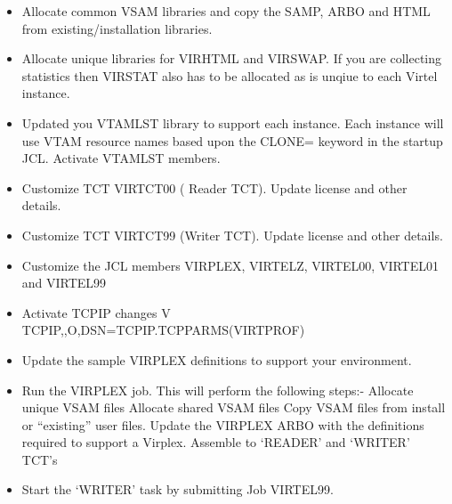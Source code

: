 \documentclass[letterpaper,10pt,english]{sphinxmanual}
\begin{document}
\begin{sphinxVerbatim}[commandchars=\\\{\}]
            
\end{sphinxVerbatim}
\begin{itemize}
\item {} 
Allocate common VSAM libraries and copy the SAMP, ARBO and HTML from existing/installation libraries.

\item {} 
Allocate unique libraries for VIRHTML and VIRSWAP. If you are collecting statistics then VIRSTAT also has to be allocated as is unqiue to each Virtel instance.

\item {} 
Updated you VTAMLST library to support each instance. Each instance will use VTAM resource names based upon the CLONE= keyword in the startup JCL. Activate VTAMLST members.

\item {} 
Customize TCT VIRTCT00 ( Reader TCT). Update license and other details.

\item {} 
Customize TCT VIRTCT99 (Writer TCT). Update license and other details.

\item {} 
Customize the JCL members VIRPLEX, VIRTELZ, VIRTEL00, VIRTEL01 and VIRTEL99

\item {} 
Activate TCPIP changes \textendash{} V TCPIP,,O,DSN=TCPIP.TCPPARMS(VIRTPROF)

\item {} 
Update the sample VIRPLEX definitions to support your environment.

\item {} 
Run the VIRPLEX job. This will perform the following steps:-
Allocate unique VSAM files
Allocate shared VSAM files
Copy VSAM files from install or “existing” user files.
Update the VIRPLEX ARBO with the definitions required to support a Virplex.
Assemble to ‘READER’ and ‘WRITER’ TCT’s

\item {} 
Start the ‘WRITER’ task by submitting Job VIRTEL99.

\end{itemize}
\end{document}
